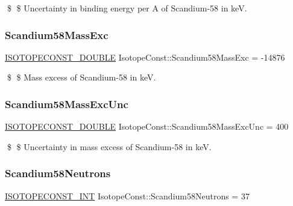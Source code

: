 \$ \$ Uncertainty in binding energy per A of Scandium-\/58 in keV. \mbox{\label{group___isotope_const-_scandium-_sc58_ga93139af3f87afefeb7b5c5f43edae014}} 
\subsubsection{\texorpdfstring{Scandium58\+Mass\+Exc}{Scandium58MassExc}}
{\footnotesize\ttfamily \mbox{\hyperlink{group___isotope_const-_macros_ga8f45a7272ce02c0b4c65c44636ed719a}{I\+S\+O\+T\+O\+P\+E\+C\+O\+N\+S\+T\+\_\+\+D\+O\+U\+B\+LE}} Isotope\+Const\+::\+Scandium58\+Mass\+Exc = -\/14876}

\$ \$ Mass excess of Scandium-\/58 in keV. \mbox{\label{group___isotope_const-_scandium-_sc58_ga4168be02bf456b5bfa26de9fafc3b03d}} 
\subsubsection{\texorpdfstring{Scandium58\+Mass\+Exc\+Unc}{Scandium58MassExcUnc}}
{\footnotesize\ttfamily \mbox{\hyperlink{group___isotope_const-_macros_ga8f45a7272ce02c0b4c65c44636ed719a}{I\+S\+O\+T\+O\+P\+E\+C\+O\+N\+S\+T\+\_\+\+D\+O\+U\+B\+LE}} Isotope\+Const\+::\+Scandium58\+Mass\+Exc\+Unc = 400}

\$ \$ Uncertainty in mass excess of Scandium-\/58 in keV. \mbox{\label{group___isotope_const-_scandium-_sc58_gaa4bff2bea03af9c36346131f801d1676}} 
\subsubsection{\texorpdfstring{Scandium58\+Neutrons}{Scandium58Neutrons}}
{\footnotesize\ttfamily \mbox{\hyperlink{group___isotope_const-_macros_ga5f18360b3e99483a35c32d789e62621c}{I\+S\+O\+T\+O\+P\+E\+C\+O\+N\+S\+T\+\_\+\+I\+NT}} Isotope\+Const\+::\+Scandium58\+Neutrons = 37}

